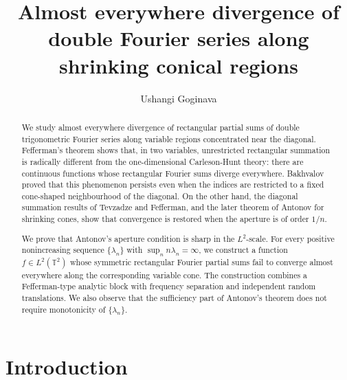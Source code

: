 \documentclass[11pt]{amsart}
\numberwithin{equation}{section}
\begin{document}
\title[Almost everywhere divergence]{Almost everywhere divergence of double Fourier series
	along shrinking conical regions}
\author{Ushangi Goginava}
\address{Department of Mathematical Sciences \\
	United Arab Emirates University, P.O. Box No. 15551\\
	Al Ain, Abu Dhabi, UAE}

\begin{abstract}
We study almost everywhere divergence of rectangular partial sums of double
trigonometric Fourier series along variable regions concentrated near the
diagonal. Fefferman's theorem shows that, in two variables, unrestricted
rectangular summation is radically different from the one-dimensional
Carleson-Hunt theory: there are continuous functions whose rectangular
Fourier sums diverge everywhere. Bakhvalov proved that this phenomenon
persists even when the indices are restricted to a fixed cone-shaped
neighbourhood of the diagonal. On the other hand, the diagonal summation
results of Tevzadze and Fefferman, and the later theorem of Antonov for
shrinking cones, show that convergence is restored when the aperture is of
order $1/n$.

We prove that Antonov's aperture condition is sharp in the $L^{2}$-scale.
For every positive nonincreasing sequence $\{\lambda _{n}\}$ with $%
\sup_{n}n\lambda _{n}=\infty $, we construct a function $f\in L^{2}(\mathbb{T%
}^{2})$ whose symmetric rectangular Fourier partial sums fail to converge
almost everywhere along the corresponding variable cone. The construction
combines a Fefferman-type analytic block with frequency separation and
independent random translations. We also observe that the sufficiency part
of Antonov's theorem does not require monotonicity of $\{\lambda _{n}\}$.
\end{abstract}

\maketitle

\section{Introduction}
\end{document}
